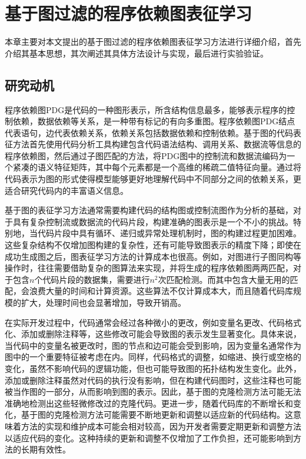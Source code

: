 \chapter{基于图过滤的程序依赖图表征学习}
\label{chap:PDG}
本章主要对本文提出的基于图过滤的程序依赖图表征学习方法进行详细介绍，首先介绍其基本思想，其次阐述其具体方法设计与实现，最后进行实验验证。

\section{研究动机}
\label{sec:PDGMotivation}

程序依赖图PDG是代码的一种图形表示，所含结构信息最多，能够表示程序的控制依赖，数据依赖等关系，是一种带有标记的有向多重图。程序依赖图PDG结点代表语句，边代表依赖关系，依赖关系包括数据依赖和控制依赖\cite{Ammons1997ExploitingHP}。基于图的代码表征方法首先使用代码分析工具构建包含代码语法结构、调用关系、数据流等信息的程序依赖图，然后通过子图匹配的方法，将PDG图中的控制流和数据流编码为一个紧凑的语义特征矩阵，其中每个元素都是一个高维的稀疏二值特征向量\cite{10.1145/3236024.3236068}。通过将代码表示为图的形式使得模型能够更好地理解代码中不同部分之间的依赖关系，更适合研究代码内的丰富语义信息。

基于图的表征学习方法通常需要构建代码的结构图或控制流图作为分析的基础，对于具有复杂控制流或数据流的代码片段，构建准确的图表示是一个不小的挑战。特别地，当代码片段中具有循环、递归或异常处理机制时，图的构建过程更加困难。这些复杂结构不仅增加图构建的复杂性，还有可能导致图表示的精度下降；即使在成功生成图之后，图表征学习方法的计算成本也很高。例如，对图进行子图同构等操作时，往往需要借助复杂的图算法来实现，并将生成的程序依赖图两两匹配，对于包含$n$个代码片段的数据集，需要进行$n^2$次匹配检测。而其中包含大量无用的匹配，会浪费大量的时间和计算资源。这些算法不仅计算成本大，而且随着代码库规模的扩大，处理时间也会显著增加，导致开销高。

在实际开发过程中，代码通常会经过各种微小的更改，例如变量名更改、代码格式化、添加或删除注释等，这些修改可能会导致图的表示发生显著变化。具体来说，当代码中的变量名被更改时，图的节点和边可能会受到影响，因为变量名通常作为图中的一个重要特征被考虑在内。同样，代码格式的调整，如缩进、换行或空格的变化，虽然不影响代码的逻辑功能，但也可能导致图的拓扑结构发生变化。此外，添加或删除注释虽然对代码的执行没有影响，但在构建代码图时，这些注释也可能被当作图的一部分，从而影响到图的表示。因此，基于图的克隆检测方法可能无法准确地检测出这些轻微修改过的克隆代码。更进一步，随着代码库的不断增长和变化，基于图的克隆检测方法可能需要不断地更新和调整以适应新的代码结构。这意味着方法的实现和维护成本可能会相对较高，因为开发者需要定期更新和调整方法以适应代码的变化。这种持续的更新和调整不仅增加了工作负担，还可能影响到方法的长期有效性。

